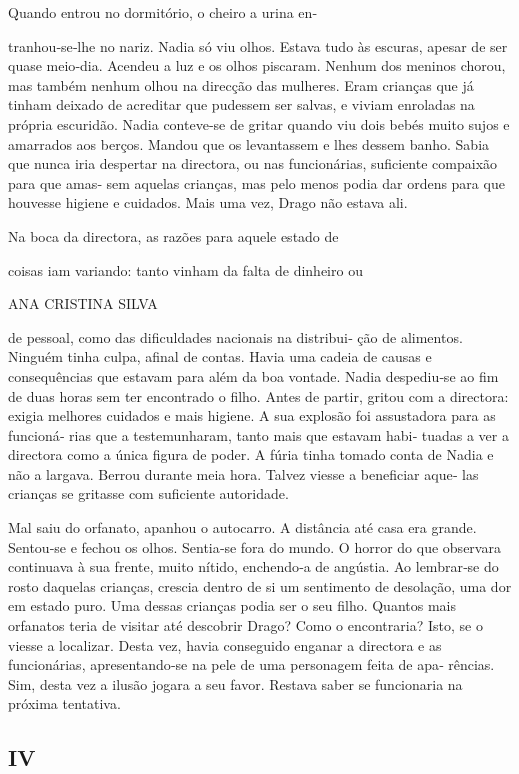 Quando entrou no dormitório, o cheiro a urina en‑

tranhou‑se‑lhe no nariz. Nadia só viu olhos. Estava tudo às escuras,
apesar de ser quase meio‑dia. Acendeu a luz e os olhos piscaram. Nenhum
dos meninos chorou, mas também nenhum olhou na direcção das mulheres.
Eram crianças que já tinham deixado de acreditar que pudessem ser
salvas, e viviam enroladas na própria escuridão. Nadia conteve‑se de
gritar quando viu dois bebés muito sujos e amarrados aos berços. Mandou
que os levantassem e lhes dessem banho. Sabia que nunca iria despertar
na directora, ou nas funcionárias, suficiente compaixão para que amas‑
sem aquelas crianças, mas pelo menos podia dar ordens para que houvesse
higiene e cuidados. Mais uma vez, Drago não estava ali.

Na boca da directora, as razões para aquele estado de

coisas iam variando: tanto vinham da falta de dinheiro ou

ANA CRISTINA SILVA

de pessoal, como das dificuldades nacionais na distribui‑ ção de
alimentos. Ninguém tinha culpa, afinal de contas. Havia uma cadeia de
causas e consequências que estavam para além da boa vontade. Nadia
despediu‑se ao fim de duas horas sem ter encontrado o filho. Antes de
partir, gritou com a directora: exigia melhores cuidados e mais higiene.
A sua explosão foi assustadora para as funcioná‑ rias que a
testemunharam, tanto mais que estavam habi‑ tuadas a ver a directora
como a única figura de poder. A fúria tinha tomado conta de Nadia e não
a largava. Berrou durante meia hora. Talvez viesse a beneficiar aque‑
las crianças se gritasse com suficiente autoridade.

Mal saiu do orfanato, apanhou o autocarro. A distância até casa era
grande. Sentou‑se e fechou os olhos. Sentia‑se fora do mundo. O horror
do que observara continuava à sua frente, muito nítido, enchendo‑a de
angústia. Ao lembrar‑se do rosto daquelas crianças, crescia dentro de si
um sentimento de desolação, uma dor em estado puro. Uma dessas crianças
podia ser o seu filho. Quantos mais orfanatos teria de visitar até
descobrir Drago? Como o encontraria? Isto, se o viesse a localizar.
Desta vez, havia conseguido enganar a directora e as funcionárias,
apresentando‑se na pele de uma personagem feita de apa‑ rências. Sim,
desta vez a ilusão jogara a seu favor. Restava saber se funcionaria na
próxima tentativa.

\subsection{IV}

